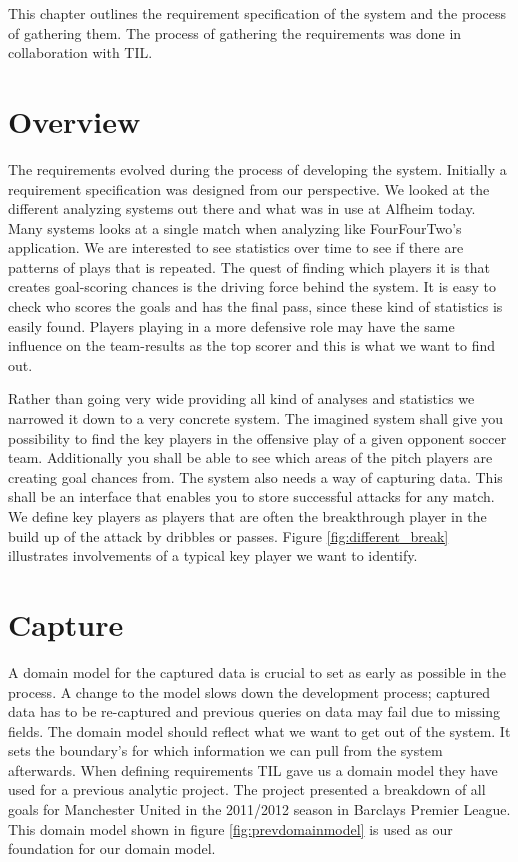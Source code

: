 This chapter outlines the requirement specification of the system and the process of gathering them. The process of gathering the requirements was done in collaboration with \ac{TIL}.

\section{Overview}
The requirements evolved during the process of developing the system. Initially a requirement specification was designed from our perspective. We looked at the different analyzing systems out there and what was in use at Alfheim today. Many systems looks at a single match when analyzing like FourFourTwo’s application. We are interested to see statistics over time to see if there are patterns of plays that is repeated. The quest of finding which players it is that creates goal-scoring chances is the driving force behind the system. It is easy to check who scores the goals and has the final pass, since these kind of statistics is easily found. Players playing in a more defensive role may have the same influence on the team-results as the top scorer and this is what we want to find out.

Rather than going very wide providing all kind of analyses and statistics we narrowed it down to a very concrete system. The imagined system shall give you possibility to find the key players in the offensive play of a given opponent soccer team. Additionally you shall be able to see which areas of the pitch players are creating goal chances from. The system also needs a way of capturing data. This shall be an interface that enables you to store successful attacks for any match. We define key players as players that are often the breakthrough player in the build up of the attack by dribbles or passes. Figure \ref{fig:different_break} illustrates involvements of a typical key player we want to identify.

\section{Capture}

A domain model for the captured data is crucial to set as early as possible in the process. A change to the model slows down the development process; captured data has to be re-captured and previous queries on data may fail due to missing fields. The domain model should reflect what we want to get out of the system. It sets the boundary's for which information we can pull from the system afterwards. When defining requirements \ac{TIL} gave us a domain model they have used for a previous analytic project. The project presented a breakdown of all goals for Manchester United in the 2011/2012 season in Barclays Premier League. This domain model shown in figure \ref{fig:prevdomainmodel} is used as our foundation for our domain model. 

